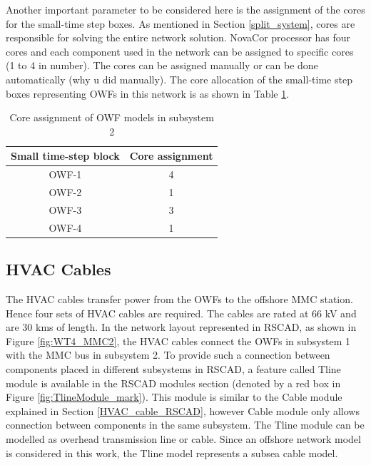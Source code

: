 Another important parameter to be considered here is the assignment of the cores for the small-time step boxes. As mentioned in Section \ref{split_system}, cores are responsible for solving the entire network solution. NovaCor processor has four cores and each component used in the network can be assigned to specific cores (1 to 4 in number). The cores can be assigned manually or can be done automatically (why u did manually). The core allocation of the small-time step boxes representing \gls{OWF}s in this network is as shown in Table \ref{tab:Core_assignment_sub2}.  

   

\begin{table}[H]
\centering
\begin{tabular}{|c|c|}
\hline
\textbf{Small time-step block} & \textbf{Core assignment} \\ \hline
OWF-1                          & 4                        \\ \hline
OWF-2                          & 1                        \\ \hline
OWF-3                          & 3                        \\ \hline
OWF-4                          & 1                        \\ \hline
\end{tabular}
\caption{Core assignment of OWF models in subsystem 2}
\label{tab:Core_assignment_sub2}
\end{table}

\subsection{HVAC Cables}\label{Tline_cable_RSCAD}
The \gls{HVAC} cables transfer power from the \gls{OWF}s to the offshore \gls{MMC} station. Hence four sets of \gls{HVAC} cables are required. The cables are rated at 66 kV and are 30 kms of length. In the network layout represented in RSCAD, as shown in Figure \ref{fig:WT4_MMC2}, the \gls{HVAC} cables connect the \gls{OWF}s in subsystem 1 with the \gls{MMC} bus in subsystem 2. To provide such a connection between components placed in different subsystems in RSCAD, a feature called Tline module is available in the RSCAD modules section (denoted by a red box in Figure \ref{fig:TlineModule_mark}). This module is similar to the Cable module explained in Section \ref{HVAC_cable_RSCAD}, however Cable module only allows connection between components in the same subsystem. The Tline module can be modelled as overhead transmission line or cable. Since an offshore network model is considered in this work, the Tline model represents a subsea cable model. 

